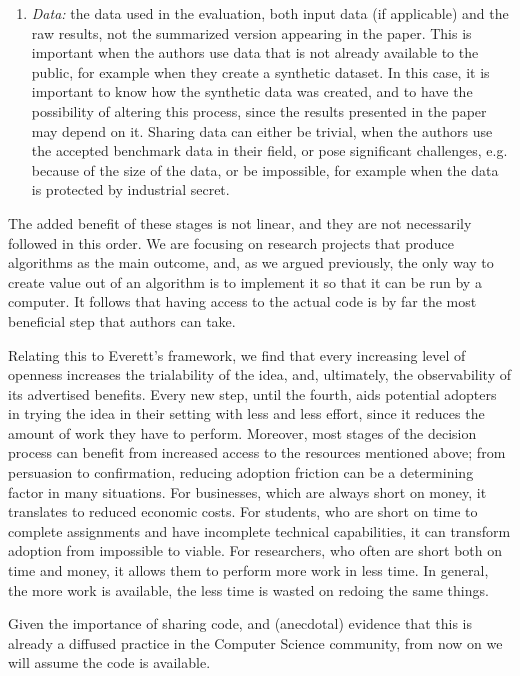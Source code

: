 \documentclass[12pt]{article}
\begin{document}
\begin{enumerate}
\item \emph{Data:} the data used in the evaluation, both input data (if applicable) and the raw results, not the summarized version appearing in the paper. This is important when the authors use data that is not already available to the public, for example when they create a synthetic dataset. In this case, it is important to know how the synthetic data was created, and to have the possibility of altering this process, since the results presented in the paper may depend on it. Sharing data can either be trivial, when the authors use the accepted benchmark data in their field, or pose significant challenges, e.g. because of the size of the data, or be impossible, for example when the data is protected by industrial secret.
\end{enumerate}

The added benefit of these stages is not linear, and they are not necessarily followed in this order. We are focusing on research projects that produce algorithms as the main outcome, and, as we argued previously, the only way to create value out of an algorithm is to implement it so that it can be run by a computer. It follows that having access to the actual code is by far the most beneficial step that authors can take.

Relating this to Everett's framework, we find that every increasing level of openness increases the trialability of the idea, and, ultimately, the observability of its advertised benefits. Every new step, until the fourth, aids potential adopters in trying the idea in their setting with less and less effort, since it reduces the amount of work they have to perform. Moreover, most stages of the decision process can benefit from increased access to the resources mentioned above; from persuasion to confirmation, reducing adoption friction can be a determining factor in many situations. For businesses, which are always short on money, it translates to reduced economic costs. For students, who are short on time to complete assignments and have incomplete technical capabilities, it can transform adoption from impossible to viable. For researchers, who often are short both on time and money, it allows them to perform more work in less time. In general, the more work is available, the less time is wasted on redoing the same things.

Given the importance of sharing code, and (anecdotal) evidence that this is already a diffused practice in the Computer Science community, from now on we will assume the code is available.
\end{document}
